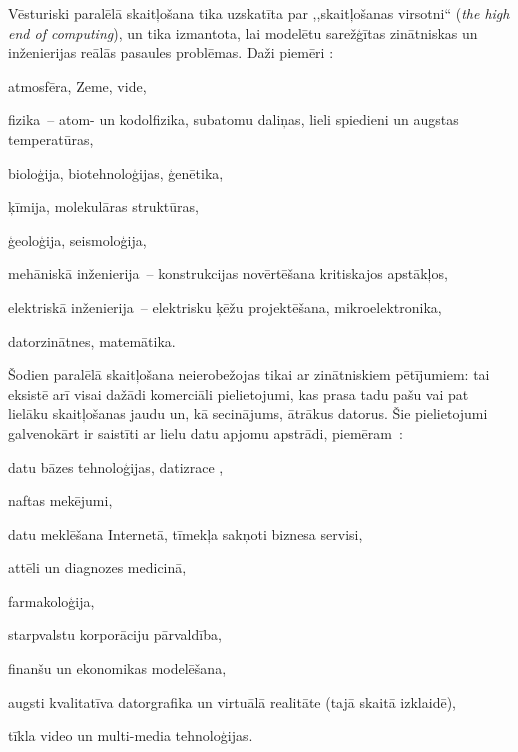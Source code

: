 Vēsturiski paralēlā skaitļošana tika uzskatīta par ,,skaitļošanas virsotni`` (\emph{the high
end of computing}), un tika izmantota, lai modelētu sarežģītas zinātniskas un inženierijas
reālās pasaules problēmas. Daži piemēri \cite{IntParComp}:
\begin{dotlist}
	\item atmosfēra, Zeme, vide,
	\item fizika~-- atom- un kodolfizika, subatomu daliņas, lieli spiedieni un augstas temperatūras,
	\item bioloģija, biotehnoloģijas, ģenētika,
	\item ķīmija, molekulāras struktūras,
	\item ģeoloģija, seismoloģija,
	\item mehāniskā inženierija~-- konstrukcijas novērtēšana kritiskajos apstākļos,
	\item elektriskā inženierija~-- elektrisku ķēžu projektēšana, mikroelektronika,
	\item datorzinātnes, matemātika.
\end{dotlist}

Šodien paralēlā skaitļošana neierobežojas tikai ar zinātniskiem pētījumiem: tai eksistē arī
visai dažādi komerciāli pielietojumi, kas prasa tadu pašu vai pat lielāku skaitļošanas jaudu
un, kā secinājums, ātrākus datorus. Šie pielietojumi galvenokārt ir saistīti ar lielu datu
apjomu apstrādi, piemēram~\cite{IntParComp}:
\begin{dotlist}
	\item datu bāzes tehnoloģijas, datizrace ,
	\item naftas mekējumi,
	\item datu meklēšana Internetā, tīmekļa sakņoti biznesa servisi,
	\item attēli un diagnozes medicinā,
	\item farmakoloģija,
	\item starpvalstu korporāciju pārvaldība,
	\item finanšu un ekonomikas modelēšana,
	\item augsti kvalitatīva datorgrafika un virtuālā realitāte (tajā skaitā izklaidē),
	\item tīkla video un multi-media tehnoloģijas.
\end{dotlist}

